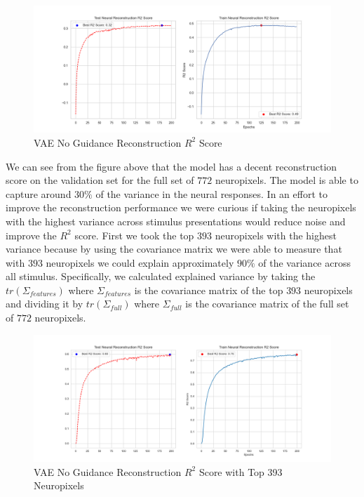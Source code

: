 \documentclass[12pt, letterpaper]{article}
\begin{document}
\begin{figure}[H]
    \centering
    \includegraphics[width=1.0\textwidth]{x_r2_128dim_200_epochs_0.05beta_2_layer.png}
    \caption{VAE No Guidance Reconstruction $R^2$ Score}
    \label{fig:vae_no_guidance}
\end{figure}

We can see from the figure above that the model has a decent reconstruction score on the validation set for the full set of $772$ neuropixels. The model is able to capture around $30\%$ of the variance in the neural responses. In an effort to improve the reconstruction performance we were curious if taking the neuropixels with the highest variance across stimulus presentations would reduce noise and improve the $R^2$ score. First we took the top $393$ neuropixels with the highest variance because by using the covariance matrix we were able to measure that with $393$ neuropixels we could explain approximately $90\%$ of the variance across all stimulus. Specifically, we calculated explained variance by taking the $tr(\Sigma_{features})$ where $\Sigma_{features}$ is the covariance matrix of the top $393$ neuropixels and dividing it by $tr(\Sigma_{full})$ where $\Sigma_{full}$ is the covariance matrix of the full set of $772$ neuropixels. 

\begin{figure}[H]
    \centering
    \includegraphics[width=1.0\textwidth]{x_r2_128dim_393_top_var_200_epochs_0.05_beta_2_layer.png}
    \caption{VAE No Guidance Reconstruction $R^2$ Score with Top 393 Neuropixels}
    \label{fig:vae_no_guidance_top393}
\end{figure}
\end{document}

